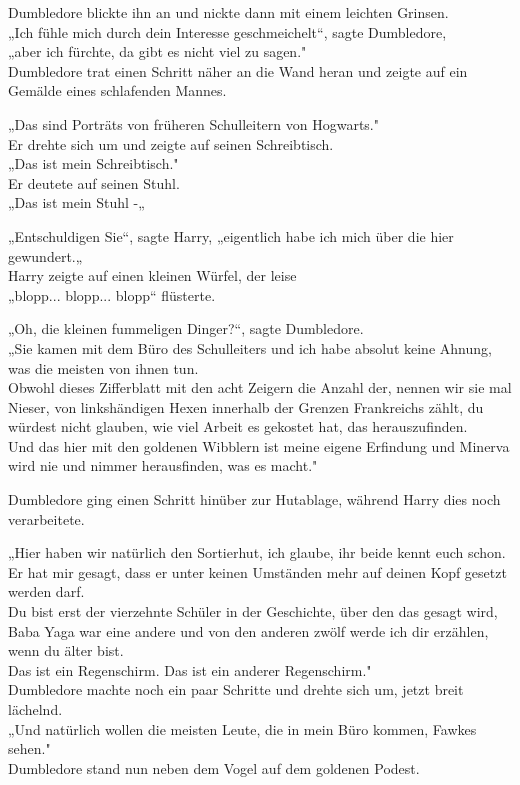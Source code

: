 {Dumbledore blickte ihn an und nickte dann mit einem leichten Grinsen.\\ „Ich fühle mich durch dein Interesse geschmeichelt“, sagte Dumbledore,\\ „aber ich fürchte, da gibt es nicht viel zu sagen."\\ Dumbledore trat einen Schritt näher an die Wand heran und zeigte auf ein Gemälde eines schlafenden Mannes.

„Das sind Porträts von früheren Schulleitern von Hogwarts."\\ Er drehte sich um und zeigte auf seinen Schreibtisch.\\ „Das ist mein Schreibtisch."\\ Er deutete auf seinen Stuhl.\\ „Das ist mein Stuhl -„

„Entschuldigen Sie“, sagte Harry, „eigentlich habe ich mich über die hier gewundert.„\\ Harry zeigte auf einen kleinen Würfel, der leise\\ „blopp... blopp... blopp“ flüsterte.

„Oh, die kleinen fummeligen Dinger?“, sagte Dumbledore.\\ „Sie kamen mit dem Büro des Schulleiters und ich habe absolut keine Ahnung, was die meisten von ihnen tun.\\ Obwohl dieses Zifferblatt mit den acht Zeigern die Anzahl der, nennen wir sie mal Nieser, von linkshändigen Hexen innerhalb der Grenzen Frankreichs zählt, du würdest nicht glauben, wie viel Arbeit es gekostet hat, das herauszufinden.\\ Und das hier mit den goldenen Wibblern ist meine eigene Erfindung und Minerva wird nie und nimmer herausfinden, was es macht."

Dumbledore ging einen Schritt hinüber zur Hutablage, während Harry dies noch verarbeitete.

„Hier haben wir natürlich den Sortierhut, ich glaube, ihr beide kennt euch schon. Er hat mir gesagt, dass er unter keinen Umständen mehr auf deinen Kopf gesetzt werden darf.\\ Du bist erst der vierzehnte Schüler in der Geschichte, über den das gesagt wird, Baba Yaga war eine andere und von den anderen zwölf werde ich dir erzählen, wenn du älter bist.\\ Das ist ein Regenschirm. Das ist ein anderer Regenschirm."\\ Dumbledore machte noch ein paar Schritte und drehte sich um, jetzt breit lächelnd.\\ „Und natürlich wollen die meisten Leute, die in mein Büro kommen, Fawkes sehen."\\ Dumbledore stand nun neben dem Vogel auf dem goldenen Podest.

}
